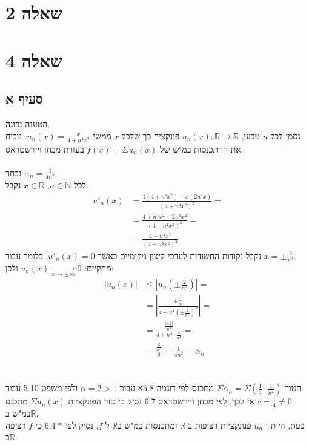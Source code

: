 \documentclass{article}
\def\reals{\mathbb{R}}
\def\naturals{\mathbb{N}}
\begin{document}
\pagebreak

\section*{שאלה 2}

\pagebreak

\section*{שאלה 4}

\subsection*{סעיף א}

הטענה נכונה. \\
נסמן לכל $n$ טבעי, $u_n(x): \reals\rightarrow\reals $ פונקציה כך שלכל $x$ ממשי $u_n(x)=\frac{x}{4+n^4x^2}$.
נוכיח את ההתכנסות במ"ש של $f(x)=\Sigma u_n(x)$ בעזרת מבחן ויירשטראס.\\\\
נבחר $\alpha_n=\frac{1}{4n^2}$ \\
לכל $n\in \naturals$, $x\in \reals$ נקבל:
\begin{align*}
    u'_n(x) & =\frac{1(4+n^4x^2)-x(2n^4x)}{(4+n^4x^2)^2}= \\
            & =\frac{4+n^4x^2-2n^4x^2}{(4+n^4x^2)^2}=     \\
            & =\frac{4-n^4x^2}{(4+n^4x^2)^2}
\end{align*}
נקבל נקודות החשודות לערכי קיצון מקומיים כאשר $u'_n(x)=0$, כלומר עבור $x=\pm \frac{2}{n^2}$. \\
מתקיים: $u_n(x)\xrightarrow[x\rightarrow \pm \infty]{}0$ ולכן:
\begin{align*}
    |u_n(x)| & \leq |u_n(\pm \frac{2}{n^2})|=                           \\
             & =|\frac{\pm \frac{2}{n^2}}{4+n^4(\pm \frac{2}{n^2})^2}|= \\
             & =\frac{\frac{|\pm 2|}{n^2}}{4+n^4\cdot \frac{4}{n^4}}=   \\
             & =\frac{\frac{2}{n^2}}{8}=\frac{1}{4n^2}=\alpha_n
\end{align*}
\\\\
הטור $\Sigma \alpha_n=\Sigma (\frac{1}{4} \cdot \frac{1}{n^2})$ מתכנס לפי דוגמה $5.8$א עבור $\alpha=2>1$ ולפי משפט 5.10 עבור $c=\frac{1}{4}\ne 0$
אי לכך, לפי מבחן ויירשטראס 6.7 נסיק כי טור הפונקציות $\Sigma u_n(x)$ מתכנס במ"ש ב$\reals$.\\
כעת, היות ו $u_n$ פנונקציות רציפות ב $\reals$ ומתכנסות במ"ש ב$\reals$ ל $f$, נסיק לפי $6.4*$ כי $f$ רציפה ב$\reals$.
\end{document}

